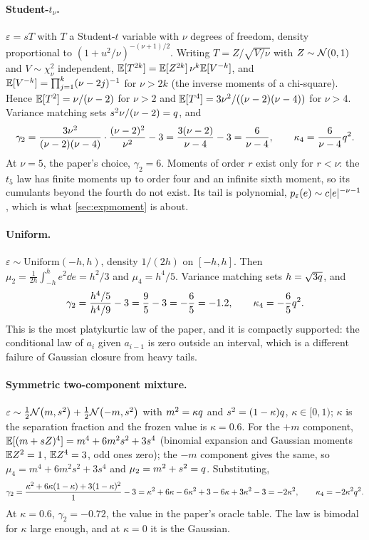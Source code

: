 \paragraph{Student-$t_\nu$.}
$\varepsilon=sT$ with $T$ a Student-$t$ variable with $\nu$ degrees of freedom,
density proportional to $(1+u^2/\nu)^{-(\nu+1)/2}$. Writing $T=Z/\sqrt{V/\nu}$ with
$Z\sim\mathcal{N}\!\left(0,1\right)$ and $V\sim\chi^2_\nu$ independent, $\mathbb{E}[T^{2k}]=\mathbb{E}[Z^{2k}]\,\nu^k\mathbb{E}[V^{-k}]$,
and $\mathbb{E}[V^{-k}]=\prod_{j=1}^k(\nu-2j)^{-1}$ for $\nu>2k$ (the inverse moments of a
chi-square). Hence $\mathbb{E}[T^2]=\nu/(\nu-2)$ for $\nu>2$ and $\mathbb{E}[T^4]=3\nu^2/((\nu-2)(\nu-4))$
for $\nu>4$. Variance matching sets $s^2\nu/(\nu-2)=q$, and
\begin{equation}
  \gamma_2=\frac{3\nu^2}{(\nu-2)(\nu-4)}\cdot\frac{(\nu-2)^2}{\nu^2}-3
  =\frac{3(\nu-2)}{\nu-4}-3=\frac{6}{\nu-4},\qquad \kappa_4=\frac{6}{\nu-4}q^2.
\end{equation}
At $\nu=5$, the paper's choice, $\gamma_2=6$. Moments of order $r$ exist only for
$r<\nu$: the $t_5$ law has finite moments up to order four and an infinite sixth moment,
so its cumulants beyond the fourth do not exist. Its tail is polynomial,
$p_{\varepsilon}(e)\sim c|e|^{-\nu-1}$, which is what \cref{sec:expmoment} is about.

\paragraph{Uniform.}
$\varepsilon\sim\mathrm{Uniform}(-h,h)$, density $1/(2h)$ on $[-h,h]$. Then
$\mu_2=\tfrac1{2h}\int_{-h}^he^2\dd e=h^2/3$ and $\mu_4=h^4/5$. Variance matching sets
$h=\sqrt{3q}$, and
\begin{equation}
  \gamma_2=\frac{h^4/5}{h^4/9}-3=\frac95-3=-\frac65=-1.2,\qquad \kappa_4=-\frac65q^2.
\end{equation}
This is the most platykurtic law of the paper, and it is compactly supported: the
conditional law of $a_i$ given $a_{i-1}$ is zero outside an interval, which is a
different failure of Gaussian closure from heavy tails.

\paragraph{Symmetric two-component mixture.}
$\varepsilon\sim\tfrac12\mathcal{N}\!\left(m,s^2\right)+\tfrac12\mathcal{N}\!\left(-m,s^2\right)$ with $m^2=\kappa q$
and $s^2=(1-\kappa)q$, $\kappa\in[0,1)$; $\kappa$ is the separation fraction and
the frozen value is $\kappa=0.6$. For the $+m$ component, $\mathbb{E}[(m+sZ)^4]=m^4+6m^2s^2+3s^4$
(binomial expansion and Gaussian moments $\mathbb{E} Z^2=1$, $\mathbb{E} Z^4=3$, odd ones zero); the
$-m$ component gives the same, so $\mu_4=m^4+6m^2s^2+3s^4$ and $\mu_2=m^2+s^2=q$.
Substituting,
\begin{equation}
  \gamma_2=\frac{\kappa^2+6\kappa(1-\kappa)+3(1-\kappa)^2}{1}-3
  =\kappa^2+6\kappa-6\kappa^2+3-6\kappa+3\kappa^2-3=-2\kappa^2,\qquad \kappa_4=-2\kappa^2q^2.
\end{equation}
At $\kappa=0.6$, $\gamma_2=-0.72$, the value in the paper's oracle table. The law is
bimodal for $\kappa$ large enough, and at $\kappa=0$ it is the Gaussian.

